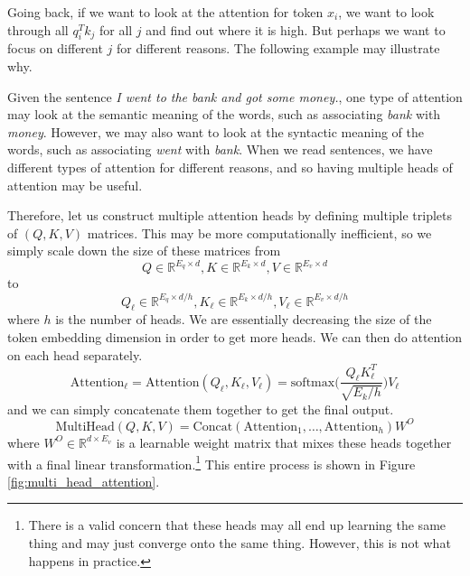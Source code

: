 \documentclass{article}
\begin{document}
    Going back, if we want to look at the attention for token $x_i$, we want to look through all $q_i^T k_j$ for all $j$ and find out where it is high. But perhaps we want to focus on different $j$ for different reasons. The following example may illustrate why. 

    \begin{example} 
      Given the sentence \textit{I went to the bank and got some money.}, one type of attention may look at the semantic meaning of the words, such as associating \textit{bank} with \textit{money}. However, we may also want to look at the syntactic meaning of the words, such as associating \textit{went} with \textit{bank}. When we read sentences, we have different types of attention for different reasons, and so having multiple heads of attention may be useful. 
    \end{example}

    \begin{definition}
      Therefore, let us construct multiple attention heads by defining multiple triplets of $(Q, K, V)$ matrices. This may be more computationally inefficient, so we simply scale down the size of these matrices from 
      \[Q \in \mathbb{R}^{E_q \times d}, K \in \mathbb{R}^{E_k \times d}, V \in \mathbb{R}^{E_v \times d}\] 
      to 
      \[Q_\ell \in \mathbb{R}^{E_q \times d/h}, K_\ell \in \mathbb{R}^{E_k \times d/h}, V_\ell \in \mathbb{R}^{E_v \times d/h}\] 
      where $h$ is the number of heads. We are essentially decreasing the size of the token embedding dimension in order to get more heads. We can then do attention on each head separately. 
      \begin{equation} 
        \mathrm{Attention}_\ell = \mathrm{Attention}(Q_\ell, K_\ell, V_\ell) = \mathrm{softmax} \bigg( \frac{Q_\ell K_\ell^T}{\sqrt{E_k/h}} \bigg) V_\ell
      \end{equation}
      and we can simply concatenate them together to get the final output. 
      \[\mathrm{MultiHead}(Q, K, V) = \mathrm{Concat}(\mathrm{Attention}_1, \ldots, \mathrm{Attention}_h) W^O\]
      where $W^O \in \mathbb{R}^{d \times E_v}$ is a learnable weight matrix that mixes these heads together with a final linear transformation.\footnote{There is a valid concern that these heads may all end up learning the same thing and may just converge onto the same thing. However, this is not what happens in practice.} This entire process is shown in Figure \ref{fig:multi_head_attention}. 
    \end{definition}
\end{document}
